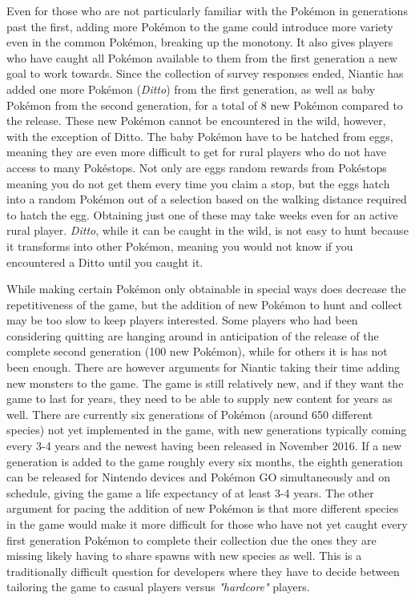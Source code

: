 Even for those who are not particularly familiar with the Pokémon in generations past the first, adding more Pokémon to the game could introduce more variety even in the common Pokémon, breaking up the monotony. It also gives players who have caught all Pokémon available to them from the first generation a new goal to work towards. Since the collection of survey responses ended, Niantic has added one more Pokémon (\emph{Ditto}) from the first generation, as well as baby Pokémon from the second generation, for a total of 8 new Pokémon compared to the release. These new Pokémon cannot be encountered in the wild, however, with the exception of Ditto. The baby Pokémon have to be hatched from eggs, meaning they are even more difficult to get for rural players who do not have access to many Pokéstops. Not only are eggs random rewards from Pokéstops meaning you do not get them every time you claim a stop, but the eggs hatch into a random Pokémon out of a selection based on the walking distance required to hatch the egg. Obtaining just one of these may take weeks even for an active rural player. \emph{Ditto}, while it can be caught in the wild, is not easy to hunt because it transforms into other Pokémon, meaning you would not know if you encountered a Ditto until you caught it.

While making certain Pokémon only obtainable in special ways does decrease the repetitiveness of the game, but the addition of new Pokémon to hunt and collect may be too slow to keep players interested. Some players who had been considering quitting are hanging around in anticipation of the release of the complete second generation (100 new Pokémon), while for others it is has not been enough. There are however arguments for Niantic taking their time adding new monsters to the game. The game is still relatively new, and if they want the game to last for years, they need to be able to supply new content for years as well. There are currently six generations of Pokémon (around 650 different species) not yet implemented in the game, with new generations typically coming every 3-4 years and the newest having been released in November 2016. If a new generation is added to the game roughly every six months, the eighth generation can be released for Nintendo devices and Pokémon GO simultaneously and on schedule, giving the game a life expectancy of at least 3-4 years. The other argument for pacing the addition of new Pokémon is that more different species in the game would make it more difficult for those who have not yet caught every first generation Pokémon to complete their collection due the ones they are missing likely having to share spawns with new species as well. This is a traditionally difficult question for developers where they have to decide between tailoring the game to casual players versus \emph{"hardcore"} players.

